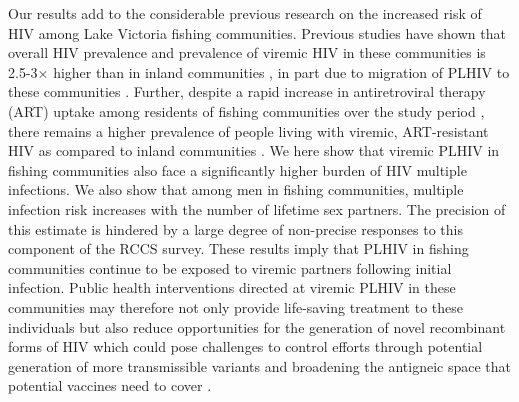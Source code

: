 \documentclass[10pt,letterpaper]{article}
\begin{document}
Our results add to the considerable previous research on the increased risk of HIV among Lake Victoria fishing communities. Previous studies have shown that overall HIV prevalence and prevalence of viremic HIV in these communities is 2.5-3$\times$ higher than in inland communities \cite{chang2016, brizzi2024}, in part due to migration of PLHIV to these communities \cite{grabowski2020,ratmann2020}. Further, despite a rapid increase in antiretroviral therapy (ART) uptake among residents of fishing communities over the study period \cite{kagaayi2019}, there remains a higher prevalence of people living with viremic, ART-resistant HIV as compared to inland communities \cite{martin2023}. We here show that viremic PLHIV in fishing communities also face a significantly higher burden of HIV multiple infections. We also show that among men in fishing communities, multiple infection risk increases with the number of lifetime sex partners. The precision of this estimate is hindered by a large degree of non-precise responses to this component of the RCCS survey. These results imply that PLHIV in fishing communities continue to be exposed to viremic partners following initial infection. Public health interventions directed at viremic PLHIV in these communities may therefore not only provide life-saving treatment to these individuals but also reduce opportunities for the generation of novel recombinant forms of HIV which could pose challenges to control efforts through potential generation of more transmissible variants and broadening the antigneic space that potential vaccines need to cover \cite{rambaut2004,corey2010, ritchie2014, kiwanuka2009, shriner2004, song2018}. \par
\end{document}
